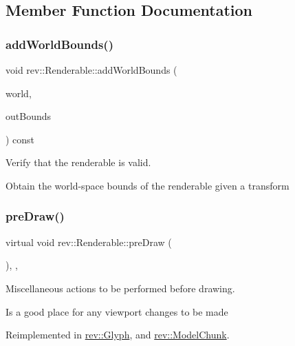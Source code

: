 \subsection{Member Function Documentation}
\mbox{\label{classrev_1_1_renderable_a136396ec9244339ac909a566a39b03fb}} 
\subsubsection{\texorpdfstring{addWorldBounds()}{addWorldBounds()}}
{\footnotesize\ttfamily void rev\+::\+Renderable\+::add\+World\+Bounds (\begin{DoxyParamCaption}\item[{const \mbox{\hyperlink{classrev_1_1_transform}{Transform}} \&}]{world,  }\item[{\mbox{\hyperlink{classrev_1_1_bounding_geometry}{Bounding\+Boxes}} \&}]{out\+Bounds }\end{DoxyParamCaption}) const}



Verify that the renderable is valid. 

Obtain the world-\/space bounds of the renderable given a transform \mbox{\label{classrev_1_1_renderable_ac1fe33dec408d65bbae10e24fbedc6bc}} 
\subsubsection{\texorpdfstring{preDraw()}{preDraw()}}
{\footnotesize\ttfamily virtual void rev\+::\+Renderable\+::pre\+Draw (\begin{DoxyParamCaption}{ }\end{DoxyParamCaption})\hspace{0.3cm}{\ttfamily [inline]}, {\ttfamily [protected]}, {\ttfamily [virtual]}}



Miscellaneous actions to be performed before drawing. 

Is a good place for any viewport changes to be made 

Reimplemented in \mbox{\hyperlink{classrev_1_1_glyph_a8abb4e9ab9d6a23c87450284b86dc636}{rev\+::\+Glyph}}, and \mbox{\hyperlink{classrev_1_1_model_chunk_a59831075966c33b791a59ab6a5f29937}{rev\+::\+Model\+Chunk}}.

